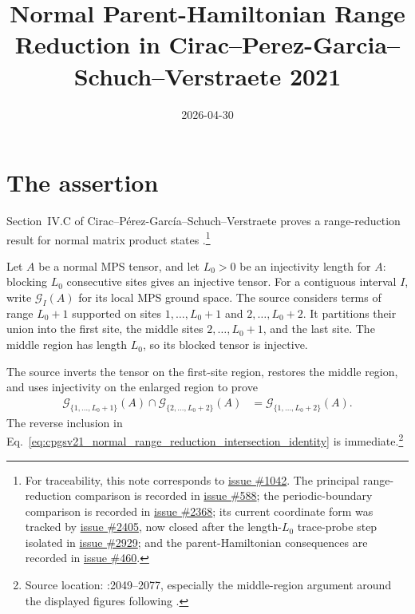 \documentclass{article}
\title{Normal Parent-Hamiltonian Range Reduction in Cirac--Perez-Garcia--Schuch--Verstraete 2021}
\author{}
\date{2026-04-30}
\begin{document}
\maketitle
{}

\section{The assertion}

Section~IV.C of Cirac--P\'erez-Garc\'ia--Schuch--Verstraete proves a
range-reduction result for normal matrix product states
\cite{Cirac2021Matrix}.\footnote{For traceability, this note corresponds to
\href{https://github.com/LionSR/TNLean/issues/1042}{issue \#1042}. The principal
range-reduction comparison is recorded in
\href{https://github.com/LionSR/TNLean/issues/588}{issue \#588}; the
periodic-boundary comparison is recorded in
\href{https://github.com/LionSR/TNLean/issues/2368}{issue \#2368}; its current
coordinate form was tracked by
\href{https://github.com/LionSR/TNLean/issues/2405}{issue \#2405}, now closed
after the length-$L_0$ trace-probe step isolated in
\href{https://github.com/LionSR/TNLean/issues/2929}{issue \#2929}; and the
parent-Hamiltonian consequences are recorded in
\href{https://github.com/LionSR/TNLean/issues/460}{issue \#460}.}

Let $A$ be a normal MPS tensor, and let $L_0>0$ be an injectivity length for
$A$: blocking $L_0$ consecutive sites gives an injective tensor. For a
contiguous interval $I$, write $\mathcal G_I(A)$ for its local MPS ground
space. The source considers terms of range $L_0+1$ supported on sites
$1,\ldots,L_0+1$ and $2,\ldots,L_0+2$. It partitions their union into the
first site, the middle sites $2,\ldots,L_0+1$, and the last site. The middle
region has length $L_0$, so its blocked tensor is injective.

The source inverts the tensor on the first-site region, restores the middle
region, and uses injectivity on the enlarged region to prove
\begin{align}
    \mathcal G_{\{1,\ldots,L_0+1\}}(A)
        \cap \mathcal G_{\{2,\ldots,L_0+2\}}(A)
        &= \mathcal G_{\{1,\ldots,L_0+2\}}(A).
    \label{eq:cpgsv21_normal_range_reduction_intersection_identity}
\end{align}
The reverse inclusion in
Eq.~\ref{eq:cpgsv21_normal_range_reduction_intersection_identity} is
immediate.\footnote{Source location:
:2049--2077, especially the
middle-region argument around the displayed figures following
.}
\end{document}
